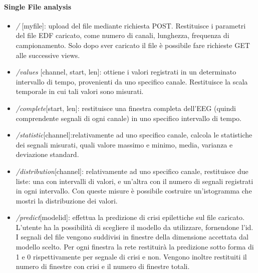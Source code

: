 \documentclass{article}
\begin{document}
\paragraph{Single File analysis}
\begin{itemize}
\item \textit{/} [myfile]: upload del file mediante richiesta POST. Restituisce i parametri del file EDF caricato, come numero di canali, lunghezza, frequenza di campionamento. Solo dopo sver caricato il file è possibile fare richieste GET alle successive views.
\item \textit{/values} [channel, start, len]: ottiene i valori registrati in un determinato intervallo di tempo, provenienti da uno specifico canale. Restituisce la scala temporale in cui tali valori sono misurati. 
\item \textit{/complete}[start, len]: restituisce una finestra completa dell'EEG (quindi comprendente segnali di ogni canale) in uno specifico intervallo di tempo. 
\item \textit{/statistic}[channel]:relativamente ad uno specifico canale, calcola le statistiche dei segnali misurati, quali valore massimo e minimo, media, varianza e deviazione standard. 
\item \textit{/distribution}[channel]: relativamente ad uno specifico canale, restituisce due liste: una con intervalli di valori, e un'altra con il numero di segnali registrati in ogni intervallo. Con queste misure è possibile costruire un'istogramma che mostri la distribuzione dei valori. 
\item \textit{/predict}[model\textunderscore id]: effettua la predizione di crisi epilettiche sul file caricato. L'utente ha la possibilità di scegliere il modello da utilizzare, fornendone l'id. I segnali del file vengono suddivisi in finestre della dimensione accettata dal modello scelto. Per ogni finestra la rete restituirà la predizione sotto forma di 1 e 0 rispettivamente per segnale di crisi e non. Vengono inoltre restituiti il numero di finestre con crisi e il numero di finestre totali. 
\end{itemize}
\end{document}
